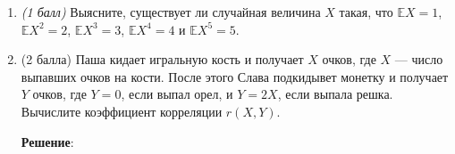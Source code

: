 \documentclass{article}
\begin{document}
\begin{enumerate}

\item \textit{(1 балл)} Выясните, существует ли случайная величина $X$ такая, что $\mathbb{E}X = 1$, $\mathbb{E}X^2 = 2$, $\mathbb{E}X^3 = 3$, $\mathbb{E}X^4 = 4$ и $\mathbb{E}X^5 = 5$.




\item (2 балла) Паша кидает игральную кость и получает $X$ очков, где $X$ — число выпавших очков на кости. После этого Слава подкидывет монетку и получает $Y$ очков, где $Y = 0$, если выпал орел, и $Y = 2X$, если выпала решка. Вычислите коэффициент корреляции $r(X, Y)$.

\textbf{Решение}:


\end{enumerate}
\end{document}
